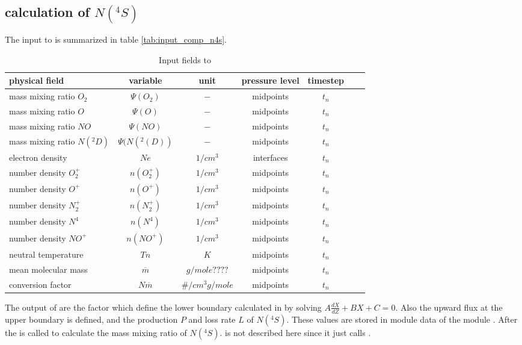 \subsection{calculation of $N(^4S)$}\label{subcap:comp_n4s}
%
The input to  is summarized in table
\ref{tab:input_comp_n4s}.
%
\begin{table}[tb]
\begin{tabular}{|p{3.5cm} ||c|c|c|c|c|c|} \hline
physical field               & variable        & unit&pressure
level& timestep
\\ \hline \hline
%
mass mixing ratio $O_2$ &       $\Psi(O_2)$              & $-$   &  midpoints & $t_n$\\
mass mixing ratio $O$ &         $\Psi(O  )$              & $-$   &  midpoints & $t_n$\\
mass mixing ratio $NO$ &       $\Psi(NO)$              & $-$   &  midpoints & $t_n$\\
mass mixing ratio $N(^2D)$ &       $\Psi(N(^2(D))$              & $-$   &  midpoints & $t_n$\\
electron density&       $Ne$              & $1/cm^3$   &  interfaces & $t_n$\\
number density $O_2^+$&       $n(O_2^+)$              & $1/cm^3$   &  midpoints & $t_n$\\
number density $O^+$&       $n(O^+)$              & $1/cm^3$   &  midpoints & $t_n$\\
number density $N_2^+$&       $n(N_2^+)$              & $1/cm^3$   &  midpoints & $t_n$\\
number density $N^4$&       $n(N^4)$              & $1/cm^3$   &  midpoints & $t_n$\\
number density $NO^+$&       $n(NO^+)$              & $1/cm^3$   &  midpoints & $t_n$\\
neutral temperature&       $Tn$              & $K$   &  midpoints & $t_n$\\
mean molecular mass&       $\overline{m}$              & $g/mole????$   &  midpoints & $t_n$\\
conversion factor&       $N \overline{m}$              & $\#/cm^3
g/mole$   &  midpoints & $t_n$
 \\ \hline
\end{tabular}
\caption{Input fields to }
\label{tab:input_comp_n2d}
\end{table}
%
The output of  are the factor which define
the lower boundary calculated in  by solving
$A\frac{d X}{dZ} + B X + C = 0$. Also the upward flux at the upper
boundary is defined, and the production $P$ and loss rate $L$ of
$N(^4S)$. These values are stored in module data of the module
. After  the
 is called to calculate the mass mixing
ratio of $N(^4S)$.  is not described here
since it just calls .
